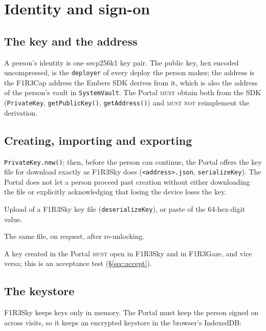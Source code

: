 \documentclass[11pt]{article}
\theoremstyle{definition}
\theoremstyle{remark}
\newcommand{\MUST}{\textsc{must}}
\newcommand{\MUSTNOT}{\textsc{must not}}
\newcommand{\code}[1]{\texttt{#1}}
\newcommand{\Em}{Embers}
\newcommand{\Sky}{F1R3Sky}
\newcommand{\Gz}{F1R3Gaze}
\begin{document}
\section{Identity and sign-on}\label{sec:identity}

\subsection{The key and the address}

A person's identity is one secp256k1 key pair. The public key, hex encoded
uncompressed, is the \code{deployer} of every deploy the person makes; the address
is the F1R3Cap address the \Em{} SDK derives from it, which is also the address of
the person's vault in \code{SystemVault}. The Portal \MUST{} obtain both from the
SDK (\code{PrivateKey}, \code{getPublicKey()}, \code{getAddress()}) and \MUSTNOT{}
reimplement the derivation.

\subsection{Creating, importing and exporting}

\begin{description}[leftmargin=*,itemsep=2pt]
\item[Create.] \code{PrivateKey.new()}; then, before the person can continue, the
  Portal offers the key file for download exactly as \Sky{} does
  (\code{<address>.json}, \code{serializeKey}). The Portal does not let a person
  proceed past creation without either downloading the file or explicitly
  acknowledging that losing the device loses the key.
\item[Import.] Upload of a \Sky{} key file (\code{deserializeKey}), or paste of the
  64-hex-digit value.
\item[Export.] The same file, on request, after re-unlocking.
\end{description}

A key created in the Portal \MUST{} open in \Sky{} and in \Gz{}, and vice versa;
this is an acceptance test (\S\ref{sec:accept}).

\subsection{The keystore}\label{sec:keystore}

\Sky{} keeps keys only in memory. The Portal must keep the person signed on across
visits, so it keeps an encrypted keystore in the browser's IndexedDB:
\end{document}
